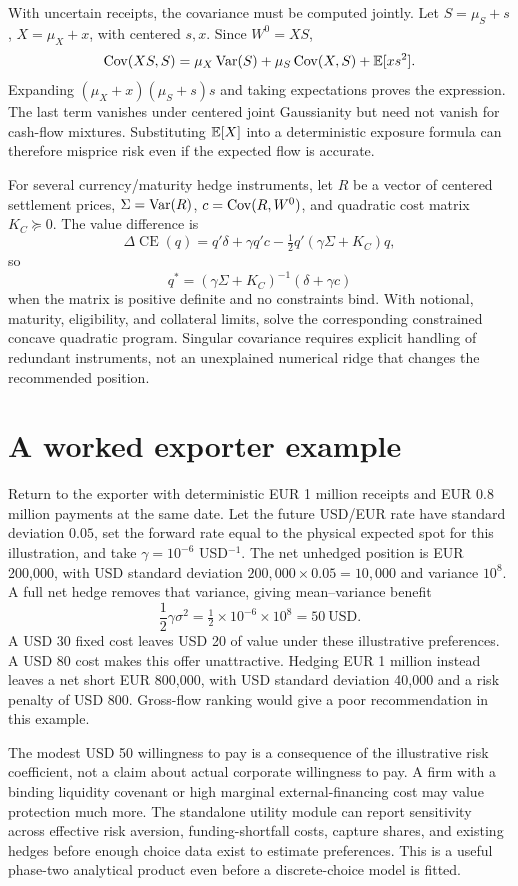 With uncertain receipts, the covariance must be computed jointly. Let $S=\mu_S+s$, $X=\mu_X+x$, with centered $s,x$. Since $W^0=XS$,
\begin{equation}
\operatorname{Cov}(XS,S)=\mu_X\operatorname{Var}(S)+\mu_S\operatorname{Cov}(X,S)+\mathbb E[xs^2].
\label{eq:randomexposure}
\end{equation}
Expanding $(\mu_X+x)(\mu_S+s)s$ and taking expectations proves the expression. The last term vanishes under centered joint Gaussianity but need not vanish for cash-flow mixtures. Substituting $\mathbb E[X]$ into a deterministic exposure formula can therefore misprice risk even if the expected flow is accurate.

For several currency/maturity hedge instruments, let $R$ be a vector of centered settlement prices, $\Sigma=\operatorname{Var}(R)$, $c=\operatorname{Cov}(R,W^0)$, and quadratic cost matrix $K_C\succeq0$. The value difference is
\begin{equation}
\Delta\operatorname{CE}(q)=q'\delta+\gamma q'c
-\tfrac12q'(\gamma\Sigma+K_C)q,
\end{equation}
so
\begin{equation}
q^*=(\gamma\Sigma+K_C)^{-1}(\delta+\gamma c)
\end{equation}
when the matrix is positive definite and no constraints bind. With notional, maturity, eligibility, and collateral limits, solve the corresponding constrained concave quadratic program. Singular covariance requires explicit handling of redundant instruments, not an unexplained numerical ridge that changes the recommended position.

\section{A worked exporter example}
Return to the exporter with deterministic EUR 1 million receipts and EUR 0.8 million payments at the same date. Let the future USD/EUR rate have standard deviation $0.05$, set the forward rate equal to the physical expected spot for this illustration, and take $\gamma=10^{-6}$ USD$^{-1}$. The net unhedged position is EUR 200,000, with USD standard deviation $200{,}000\times0.05=10{,}000$ and variance $10^8$. A full net hedge removes that variance, giving mean--variance benefit
\begin{equation}
\frac12\gamma\sigma^2=\tfrac12\times10^{-6}\times10^8=50\ \text{USD}.
\end{equation}
A USD 30 fixed cost leaves USD 20 of value under these illustrative preferences. A USD 80 cost makes this offer unattractive. Hedging EUR 1 million instead leaves a net short EUR 800,000, with USD standard deviation 40,000 and a risk penalty of USD 800. Gross-flow ranking would give a poor recommendation in this example.

The modest USD 50 willingness to pay is a consequence of the illustrative risk coefficient, not a claim about actual corporate willingness to pay. A firm with a binding liquidity covenant or high marginal external-financing cost may value protection much more. The standalone utility module can report sensitivity across effective risk aversion, funding-shortfall costs, capture shares, and existing hedges before enough choice data exist to estimate preferences. This is a useful phase-two analytical product even before a discrete-choice model is fitted.
